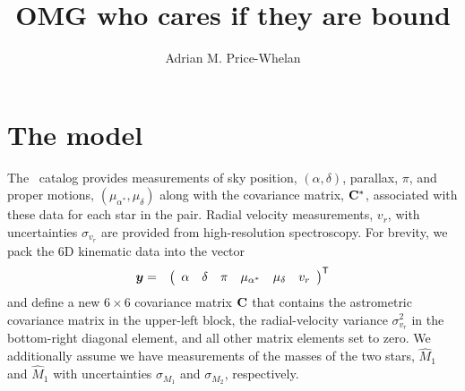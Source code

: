 \documentclass[12pt,letterpaper]{article}
\newcommand{\tgas}{\acronym{TGAS}}
\begin{document}
\sloppy\sloppypar\raggedbottom\frenchspacing %

\title{OMG who cares if they are bound}

\author{
  Adrian M. Price-Whelan
}

\maketitle

\section{The model}
\label{sec:model}

The \tgas\ catalog provides measurements of sky position, $(\alpha, \delta)$,
parallax, $\pi$, and proper motions, $(\mu_{\alpha^*}, \mu_\delta)$ along with
the covariance matrix, $\mathbf{C}^{*}$, associated with these data for each star
in the pair.
Radial velocity measurements, $v_r$, with uncertainties $\sigma_{v_r}$ are
provided from high-resolution spectroscopy.
For brevity, we pack the 6D kinematic data into the vector
\begin{eqnarray}
  \boldsymbol{y} &=&
      {\left(
        \begin{array}{c c c c c c}
          \alpha &
          \delta &
          \pi &
          \mu_{\alpha^*} &
          \mu_\delta &
          v_r
        \end{array}
      \right)}^{\mathsf{T}}
\end{eqnarray}
and define a new $6\times6$ covariance matrix $\mathbf{C}$ that contains the
astrometric covariance matrix in the upper-left block, the radial-velocity
variance $\sigma_{v_r}^2$ in the bottom-right diagonal element, and all other
matrix elements set to zero.
We additionally assume we have measurements of the masses of the two stars,
$\hat{M}_1$ and $\hat{M}_1$ with uncertainties $\sigma_{M_1}$ and
$\sigma_{M_2}$, respectively.
\end{document}
